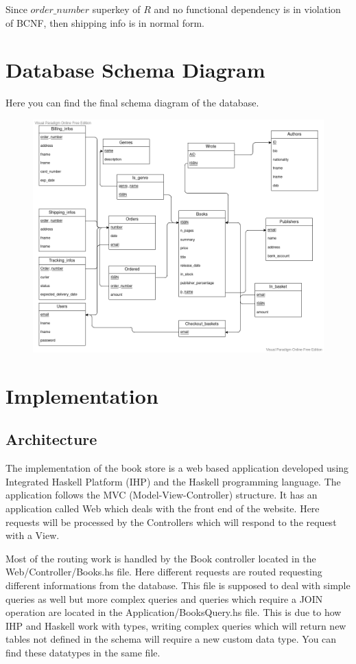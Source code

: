 \documentclass[fleqn]{scrreprt}
\begin{document}
Since $order\_number$ superkey of $R$ and no functional dependency is in violation
of BCNF, then shipping info is in normal form.

\chapter{Database Schema Diagram}
Here you can find the final schema diagram of the database.
\begin{figure}[h]\centering
    \includegraphics[width=\columnwidth]{database-schema-diagram.vpd.png}
    \label{fig:dsd}
\end{figure}

\chapter{Implementation}
\section{Architecture}
The implementation of the book store is a web based application developed using
Integrated Haskell Platform (IHP) and the Haskell programming language. The
application follows the MVC (Model-View-Controller) structure. It has an application
called Web which deals with the front end of the website. Here requests will be
processed by the Controllers which will respond to the request with a View.

Most of the routing work is handled by the Book controller located in the Web/Controller/Books.hs
file. Here different requests are routed requesting different informations from
the database. This file is supposed to deal with simple queries as well but
more complex queries and queries which require a JOIN operation are located
in the Application/BooksQuery.hs file. This is due to how IHP and Haskell work
with types, writing complex queries which will return new tables not defined
in the schema will require a new custom data type. You can find these datatypes
in the same file.
\end{document}
